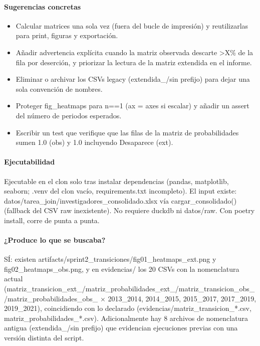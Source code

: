 \paragraph{Sugerencias concretas}
\begin{itemize}
  \item Calcular matrices una sola vez (fuera del bucle de impresión) y reutilizarlas para print, figuras y exportación.
  \item Añadir advertencia explícita cuando la matriz observada descarte >X\% de la fila por deserción, y priorizar la lectura de la matriz extendida en el informe.
  \item Eliminar o archivar los CSVs legacy (extendida\_/sin prefijo) para dejar una sola convención de nombres.
  \item Proteger fig\_heatmaps para n==1 (ax = axes si escalar) y añadir un assert del número de periodos esperados.
  \item Escribir un test que verifique que las filas de la matriz de probabilidades sumen 1.0 (obs) y 1.0 incluyendo Desaparece (ext).
\end{itemize}

\paragraph{Ejecutabilidad}
Ejecutable en el clon solo tras instalar dependencias (pandas, matplotlib, seaborn; .venv del clon vacío, requirements.txt incompleto). El input existe: datos/tarea\_join/investigadores\_consolidado.xlsx vía cargar\_consolidado() (fallback del CSV raw inexistente). No requiere duckdb ni datos/raw. Con poetry install, corre de punta a punta.

\paragraph{¿Produce lo que se buscaba?}
SÍ: existen artifacts/sprint2\_transiciones/fig01\_heatmaps\_ext.png y fig02\_heatmaps\_obs.png, y en evidencias/ los 20 CSVs con la nomenclatura actual (matriz\_transicion\_ext\_/matriz\_probabilidades\_ext\_/matriz\_transicion\_obs\_/matriz\_probabilidades\_obs\_ $\times$ 2013\_2014, 2014\_2015, 2015\_2017, 2017\_2019, 2019\_2021), coincidiendo con lo declarado (evidencias/matriz\_transicion\_*.csv, matriz\_probabilidades\_*.csv). Adicionalmente hay 8 archivos de nomenclatura antigua (extendida\_/sin prefijo) que evidencian ejecuciones previas con una versión distinta del script.

